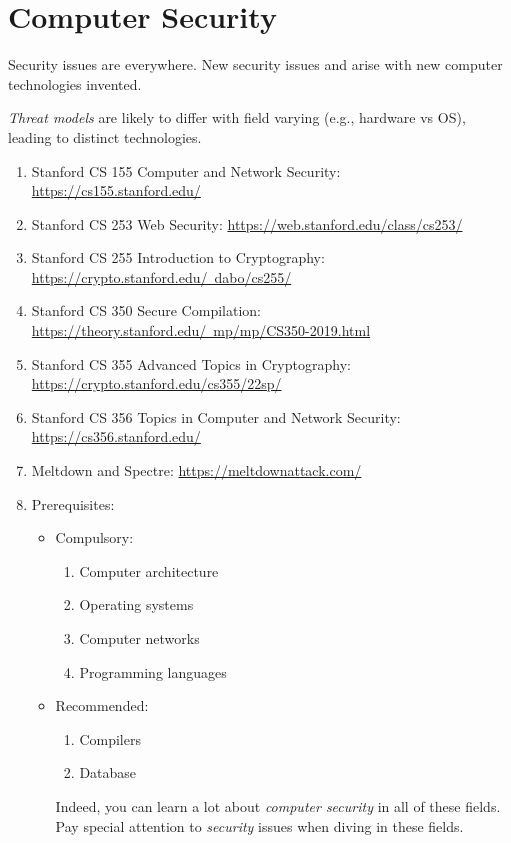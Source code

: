 \documentclass{article}
\begin{document}
\section{Computer Security}
Security issues are everywhere.
New security issues and arise with new computer technologies invented.

\emph{Threat models} are likely to differ with field varying (e.g., hardware vs OS), leading to distinct technologies.
\begin{enumerate}
    \item Stanford CS 155 Computer and Network Security:
    \href{https://cs155.stanford.edu/}{https://cs155.stanford.edu/}
    \item Stanford CS 253 Web Security:
    \href{https://web.stanford.edu/class/cs253/}{https://web.stanford.edu/class/cs253/}
    \item Stanford CS 255 Introduction to Cryptography:
    \href{https://crypto.stanford.edu/~dabo/cs255/}{https://crypto.stanford.edu/~dabo/cs255/}
    \item Stanford CS 350 Secure Compilation:\\
    \href{https://theory.stanford.edu/~mp/mp/CS350-2019.html}{https://theory.stanford.edu/~mp/mp/CS350-2019.html}
    \item Stanford CS 355 Advanced Topics in Cryptography:\\
    \href{https://crypto.stanford.edu/cs355/22sp/}{https://crypto.stanford.edu/cs355/22sp/}
    \item Stanford CS 356 Topics in Computer and Network Security:
    \href{https://cs356.stanford.edu/}{https://cs356.stanford.edu/}
    \item Meltdown and Spectre:
    \href{https://meltdownattack.com/}{https://meltdownattack.com/}
    \item Prerequisites:
    \begin{itemize}
        \item Compulsory:
        \begin{enumerate}
            \item Computer architecture
            \item Operating systems
            \item Computer networks
            \item Programming languages
        \end{enumerate}
        \item Recommended:
        \begin{enumerate}
            \item Compilers
            \item Database
        \end{enumerate}
        Indeed, you can learn a lot about \emph{computer security} in all of these fields.
        Pay special attention to \emph{security} issues when diving in these fields.
    \end{itemize}
\end{enumerate}
\end{document}
